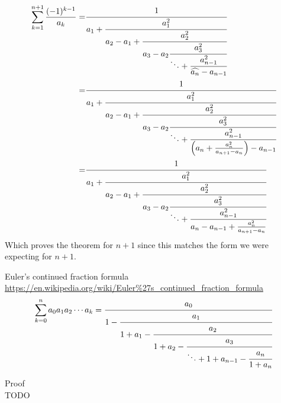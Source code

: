 \documentclass[a4paper]{article}
\begin{document}
\begin{theorem}
        \begin{align*}
            \sum_{k=1}^{n+1} \frac{(-1)^{k-1}}{a_k} =& \cfrac{1}{a_1+\cfrac{a_{1}^{2}}{a_2 - a_1 +\cfrac{a_2^2}{a_3 - a_2
            \cfrac{a_3^2}{\ddots + \cfrac{a_{n-1}^2}{\widehat{a_n} - a_{n-1}}}}}}
            \\
            =& \cfrac{1}{a_1+\cfrac{a_{1}^{2}}{a_2 - a_1 +\cfrac{a_2^2}{a_3 - a_2
            \cfrac{a_3^2}{\ddots + \cfrac{a_{n-1}^2}{\Big( a_{n} + \frac{a_n^2}{a_{n+1} - a_{n}} \Big) - a_{n-1}}}}}}
            \\
            =& \cfrac{1}{a_1+\cfrac{a_{1}^{2}}{a_2 - a_1 +\cfrac{a_2^2}{a_3 - a_2
            \cfrac{a_3^2}{\ddots + \cfrac{a_{n-1}^2}{a_{n} - a_{n-1} + \frac{a_n^2}{a_{n+1} - a_{n}} }}}}}
        \end{align*}
        Which proves the theorem for $n+1$ since this matches the form we were expecting for $n+1$.

    \end{theorem}

    \begin{theorem}
        \label{euler_continued_fraction_formula}
        Euler's continued fraction formula
        \\
        \url{https://en.wikipedia.org/wiki/Euler%27s_continued_fraction_formula}
        \[
        \sum_{k=0}^{n}  a_0 a_1 a_2 \cdots a_k = \cfrac{a_0}{1 - \cfrac{a_{1}}{1 + a_1 - \cfrac{a_2}{1 + a_2 -
        \cfrac{a_3}{\ddots +  1 + a_{n-1} - \cfrac{a_{n}}{1 + a_n}}}}}
        \]

        Proof\\
        TODO
    \end{theorem}
\end{document}
